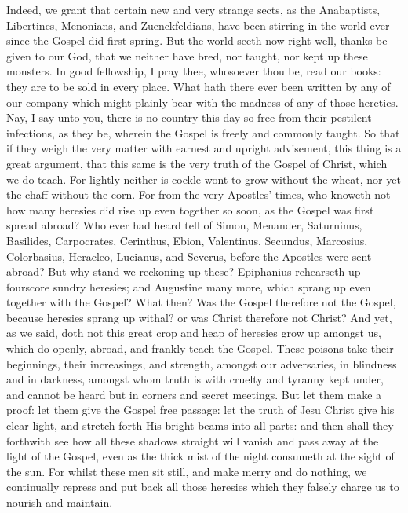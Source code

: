 Indeed, we grant that certain new and very strange sects, as the
Anabaptists, Libertines, Menonians, and Zuenckfeldians, have been stirring
in the world ever since the Gospel did first spring. But the world
seeth now right well, thanks be given to our God, that we neither have
bred, nor taught, nor kept up these monsters. In good fellowship,
I pray thee, whosoever thou be, read our books: they are to be sold
in every place. What hath there ever been written by any of our
company which might plainly bear with the madness of any of those heretics.
Nay, I say unto you, there is no country this day so free from their
pestilent infections, as they be, wherein the Gospel is
freely and commonly taught. So that if they weigh the very matter
with earnest and upright advisement, this thing is a great argument,
that this same is the very truth of the Gospel of Christ, which we do
teach. For lightly neither is cockle wont to grow without the
wheat, nor yet the chaff without the corn. For from the very Apostles’
times, who knoweth not how many heresies did rise up even together so
soon, as the Gospel was first spread abroad? Who ever had heard
tell of Simon, Menander, Saturninus, Basilides, Carpocrates, Cerinthus,
Ebion, Valentinus, Secundus, Marcosius, Colorbasius, Heracleo, Lucianus,
and Severus, before the Apostles were sent abroad? But why stand
we reckoning up these? Epiphanius rehearseth up fourscore sundry
heresies; and Augustine many more, which sprang up even together with
the Gospel? What then? Was the Gospel therefore not the
Gospel, because heresies sprang up withal? or was Christ therefore not
Christ? And yet, as we said, doth not this great crop and heap
of heresies grow up amongst us, which do openly, abroad, and frankly
teach the Gospel. These poisons take their beginnings, their increasings,
and strength, amongst our adversaries, in blindness and in darkness,
amongst whom truth is with cruelty and tyranny kept under, and cannot
be heard but in
corners and secret meetings. But let them make a proof: let them
give the Gospel free passage: let the truth of Jesu Christ give his
clear light, and stretch forth His bright beams into all parts: and
then shall they forthwith see how all these shadows straight will vanish
and pass away at the light of the Gospel, even as the thick mist of
the night consumeth at the sight of the sun. For whilst these
men sit still, and make merry and do nothing, we continually repress
and put back all those heresies which they falsely charge us to nourish
and maintain.

